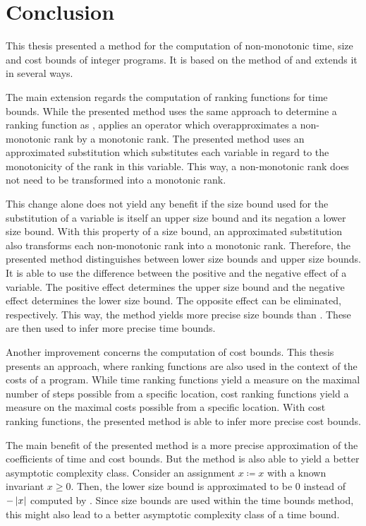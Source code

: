 \chapter{Conclusion}

This thesis presented a method for the computation of non-monotonic time, size and cost bounds of integer programs.
It is based on the method of \cite{koat} and extends it in several ways.

The main extension regards the computation of ranking functions for time bounds.
While the presented method uses the same approach to determine a ranking function as \cite{koat}, \cite{koat} applies an operator which overapproximates a non-monotonic rank by a monotonic rank.
The presented method uses an approximated substitution which substitutes each variable in regard to the monotonicity of the rank in this variable.
This way, a non-monotonic rank does not need to be transformed into a monotonic rank.

This change alone does not yield any benefit if the size bound used for the substitution of a variable is itself an upper size bound and its negation a lower size bound.
With this property of a size bound, an approximated substitution also transforms each non-monotonic rank into a monotonic rank.
Therefore, the presented method distinguishes between lower size bounds and upper size bounds.
It is able to use the difference between the positive and the negative effect of a variable.
The positive effect determines the upper size bound and the negative effect determines the lower size bound.
The opposite effect can be eliminated, respectively.
This way, the method yields more precise size bounds than \cite{koat}.
These are then used to infer more precise time bounds.

Another improvement concerns the computation of cost bounds.
This thesis presents an approach, where ranking functions are also used in the context of the costs of a program.
While time ranking functions yield a measure on the maximal number of steps possible from a specific location, cost ranking functions yield a measure on the maximal costs possible from a specific location.
With cost ranking functions, the presented method is able to infer more precise cost bounds.

The main benefit of the presented method is a more precise approximation of the coefficients of time and cost bounds.
But the method is also able to yield a better asymptotic complexity class.
Consider an assignment $x \coloneqq x$ with a known invariant $x \geq 0$.
Then, the lower size bound is approximated to be $0$ instead of $-\left|x\right|$ computed by \cite{koat}.
Since size bounds are used within the time bounds method, this might also lead to a better asymptotic complexity class of a time bound.

